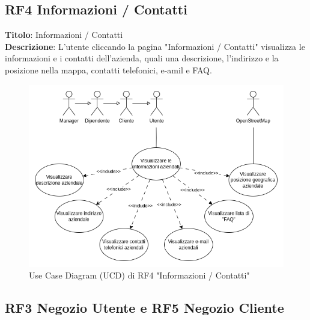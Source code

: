 \documentclass{report}
\begin{document}
\subsection*{RF4 Informazioni / Contatti}

\textbf{Titolo}: Informazioni / Contatti\\
\textbf{Descrizione}: L'utente cliccando la pagina "Informazioni / Contatti" visualizza le informazioni e i contatti dell'azienda, quali una descrizione, l'indirizzo e la posizione nella mappa, contatti telefonici, e-amil e FAQ.

\begin{figure}[H]
	\centering\includegraphics[width=1\textwidth]{images/UCD/RF4_infocontatti_UCD.png}
	Use Case Diagram (UCD) di RF4 "Informazioni / Contatti"
\end{figure}


\subsection*{RF3 Negozio Utente e RF5 Negozio Cliente}
\end{document}
